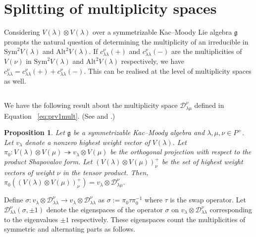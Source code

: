 \documentclass[12pt,reqno]{amsart}
\theoremstyle{plain}
\newtheorem{proposition}[theorem]{Proposition}
\theoremstyle{definition}
\theoremstyle{plain}
\newcommand{\mcd}{\mathcal{D}_{\!\lambda\mu}^{\nu}}
\newcommand{\lie}{\mathfrak}
\begin{document}
\section{Splitting of multiplicity spaces}

Considering $V(\lambda)\otimes V(\lambda)$ over a symmetrizable Kac--Moody Lie algebra $\lie g$ prompts the natural question of determining the multiplicity of an irreducible in $\text{Sym}^2 V(\lambda)$ and $\text{Alt}^2V(\lambda).$ If $c_{\lambda\lambda}^{\nu}(+)$ and $c_{\lambda\lambda}^{\nu}(-)$ are the multiplicities of $V(\nu)$ in $\text{Sym}^2 V(\lambda)$ and $\text{Alt}^2V(\lambda)$ respectively, we have $c_{\lambda\lambda}^\nu=c_{\lambda\lambda}^{\nu}(+) + c_{\lambda\lambda}^{\nu}(-).$ This can be realised at the level of multiplicity spaces as well. 

\subsection{}
We have the following result about the multiplicity space $\mcd$ defined in Equation ~\eqref{eq:prv1mult}.
(See \cite{GE} and \cite{MRV}.)
\begin{proposition}\label{prop:pi0-image}
    Let $\mathfrak{g}$ be a symmetrizable Kac--Moody algebra and $\lambda, \mu, \nu \in P^+$. 
    Let $v_\lambda$ denote a nonzero highest weight vector of $V(\lambda)$. Let $\pi_0: V(\lambda)\otimes V(\mu)\twoheadrightarrow v_\lambda\otimes V(\mu)$ be the orthogonal projection with respect to the product Shapovalov form. Let $\left(V(\lambda)\otimes V(\mu)\right)_{\nu}^+$  be the set of highest weight vectors of weight $\nu$ in the tensor product. Then, $\pi_0(\left(V(\lambda)\otimes V(\mu)\right)_\nu^+)= v_{\lambda}\otimes \mcd.$
\end{proposition}
 
Define $\sigma: v_\lambda\otimes \mathcal{D}_{\lambda\lambda}^\nu\to v_\lambda\otimes \mathcal{D}_{\lambda\lambda}^\nu$ as $\sigma:=\pi_0\tau\pi_0^{-1}$ where $\tau$ is the swap operator. Let $\mathcal{D}_{\lambda\lambda}^{\nu}(\sigma,\pm1)$ denote the eigenspaces of the operator $\sigma$ on $v_\lambda\otimes \mathcal{D}_{\lambda\lambda}^{\nu}$ corresponding to the eigenvalues $\pm 1$ respectively. These eigenspaces count the multiplicities of symmetric and alternating parts as follows.
\end{document}
